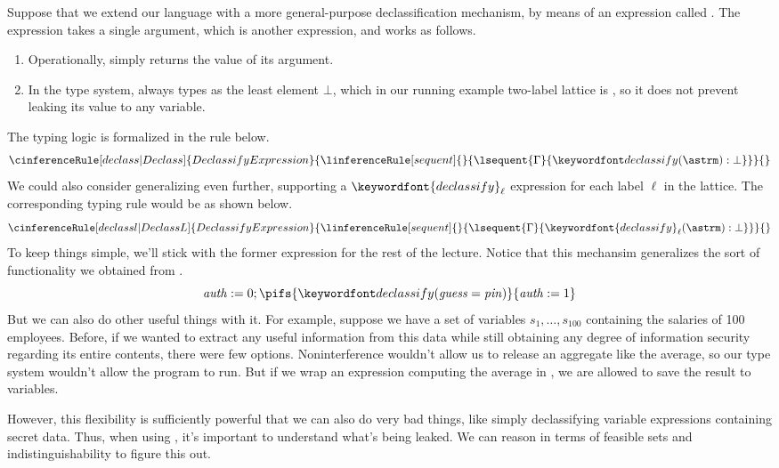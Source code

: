 \documentclass[11pt,twoside]{scrartcl}
\begin{document}
Suppose that we extend our language with a more general-purpose declassification mechanism, by means of an expression called . The expression  takes a single argument, which is another expression, and works as follows.
\begin{enumerate}
\item Operationally,  simply returns the value of its argument.
\item In the type system,  always types as the least element $\bot$, which in our running example two-label lattice is \lowsec, so it does not prevent leaking its value to any variable.
\end{enumerate}
The typing logic is formalized in the rule below.
\[
\cinferenceRule[declass|Declass]{Declassify Expression}
{\linferenceRule[sequent]
  {}
  {\lsequent{\Gamma}{\pdeclass{\astrm} : \bot}}
}{}%
\]
We could also consider generalizing even further, supporting a $\keywordfont{declassify}_\ell$ expression for each label $\ell$ in the lattice. The corresponding typing rule would be as shown below.
\[
\cinferenceRule[declassl|DeclassL]{Declassify Expression}
{\linferenceRule[sequent]
  {}
  {\lsequent{\Gamma}{\keywordfont{declassify}_\ell(\astrm) : \bot}}
}{}%
\]
To keep things simple, we'll stick with the former expression  for the rest of the lecture.
Notice that this mechansim generalizes the sort of functionality we obtained from .
\[
\mathit{auth} := 0; \pifs{\pdeclass{\mathit{guess}=\mathit{pin}}}{\mathit{auth}:=1}
\]
But we can also do other useful things with it. For example, suppose we have a set of variables $s_1, \ldots, s_{100}$ containing the salaries of 100 employees. Before, if we wanted to extract any useful information from this data while still obtaining any degree of information security regarding its entire contents, there were few options. Noninterference wouldn't allow us to release an aggregate like the average, so our type system wouldn't allow the program to run. But if we wrap an expression computing the average in , we are allowed to save the result to \lowsec variables.

However, this flexibility is sufficiently powerful that we can also do very bad things, like simply declassifying variable expressions containing secret data. Thus, when using , it's important to understand what's being leaked. We can reason in terms of feasible sets and indistinguishability to figure this out.
\end{document}
